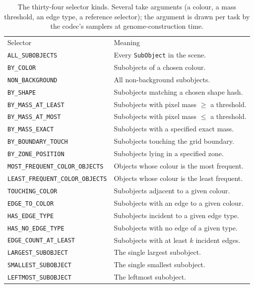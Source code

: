 \begin{table}[htbp]
\centering
\caption{The thirty-four selector kinds. Several take arguments (a colour, a mass
threshold, an edge type, a reference selector); the argument is drawn per task by the
codec's samplers at genome-construction time.}
\label{tab:app-selectors}
\small
\begin{tabular}{p{5.6cm}p{7.4cm}}
\hline\noalign{\smallskip}
Selector & Meaning \\
\noalign{\smallskip}\hline\noalign{\smallskip}
\texttt{ALL\_SUBOBJECTS} & Every \texttt{SubObject} in the scene. \\
\texttt{BY\_COLOR} & Subobjects of a chosen colour. \\
\texttt{NON\_BACKGROUND} & All non-background subobjects. \\
\texttt{BY\_SHAPE} & Subobjects matching a chosen shape hash. \\
\texttt{BY\_MASS\_AT\_LEAST} & Subobjects with pixel mass $\ge$ a threshold. \\
\texttt{BY\_MASS\_AT\_MOST} & Subobjects with pixel mass $\le$ a threshold. \\
\texttt{BY\_MASS\_EXACT} & Subobjects with a specified exact mass. \\
\texttt{BY\_BOUNDARY\_TOUCH} & Subobjects touching the grid boundary. \\
\texttt{BY\_ZONE\_POSITION} & Subobjects lying in a specified zone. \\
\texttt{MOST\_FREQUENT\_COLOR\_OBJECTS} & Objects whose colour is the most frequent. \\
\texttt{LEAST\_FREQUENT\_COLOR\_OBJECTS} & Objects whose colour is the least frequent. \\
\texttt{TOUCHING\_COLOR} & Subobjects adjacent to a given colour. \\
\texttt{EDGE\_TO\_COLOR} & Subobjects with an edge to a given colour. \\
\texttt{HAS\_EDGE\_TYPE} & Subobjects incident to a given edge type. \\
\texttt{HAS\_NO\_EDGE\_TYPE} & Subobjects with no edge of a given type. \\
\texttt{EDGE\_COUNT\_AT\_LEAST} & Subobjects with at least $k$ incident edges. \\
\texttt{LARGEST\_SUBOBJECT} & The single largest subobject. \\
\texttt{SMALLEST\_SUBOBJECT} & The single smallest subobject. \\
\texttt{LEFTMOST\_SUBOBJECT} & The leftmost subobject. \\

\end{tabular}
\end{table}
